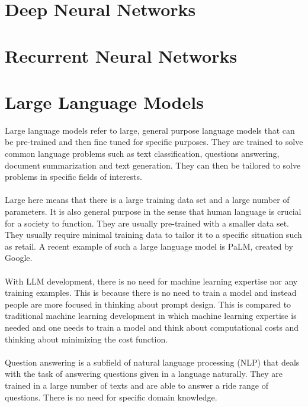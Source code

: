\documentclass[a4paper]{article}
\begin{document}
\begin{enumerate}
\pagebreak
\section{Deep Neural Networks}

\pagebreak
\section{Recurrent Neural Networks}

\pagebreak
\section{Large Language Models}
Large language models refer to large, general purpose language models that can be pre-trained and then fine tuned for specific purposes. They are trained to solve common language problems such as text classification, questions answering, document summarization and text generation. They can then be tailored to solve problems in specific fields of interests. \\~\\

Large here means that there is a large training data set and a large number of parameters. It is also general purpose in the sense that human language is crucial for a society to function. They are usually pre-trained with a smaller data set. They usually require minimal training data to tailor it to a specific situation such as retail. A recent example of such a large language model is PaLM, created by Google. \\~\\

With LLM development, there is no need for machine learning expertise nor any training examples. This is because there is no need to train a model and instead people are more focused in thinking about prompt design. This is compared to traditional machine learning development in which machine learning expertise is needed and one needs to train a model and think about computational costs and thinking about minimizing the cost function. \\~\\

Question answering is a subfield of natural language processing (NLP) that deals with the task of answering questions given in a language naturally. They are trained in a large number of texts and are able to answer a ride range of questions. There is no need for specific domain knowledge. \\~\\


\end{enumerate}
\end{document}
